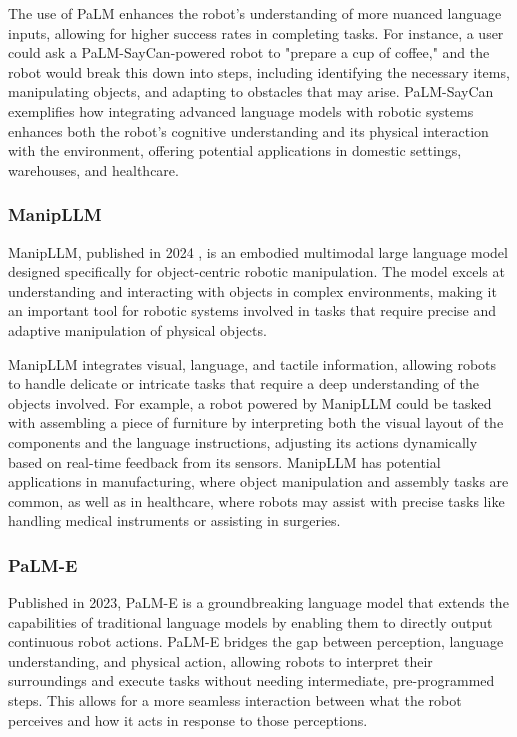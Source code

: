 The use of PaLM enhances the robot's understanding of more nuanced language inputs, allowing for higher success rates in completing tasks. 
For instance, a user could ask a PaLM-SayCan-powered robot to "prepare a cup of coffee," and the robot would break this down into steps, including identifying the necessary items, manipulating objects, and adapting to obstacles that may arise. 
PaLM-SayCan exemplifies how integrating advanced language models with robotic systems enhances both the robot's cognitive understanding and its physical interaction with the environment, offering potential applications in domestic settings, warehouses, and healthcare.

\subsubsection{ManipLLM}

ManipLLM, published in 2024 \cite{li2024manipllm}, is an embodied multimodal large language model designed specifically for object-centric robotic manipulation. 
The model excels at understanding and interacting with objects in complex environments, making it an important tool for robotic systems involved in tasks that require precise and adaptive manipulation of physical objects.

ManipLLM integrates visual, language, and tactile information, allowing robots to handle delicate or intricate tasks that require a deep understanding of the objects involved. 
For example, a robot powered by ManipLLM could be tasked with assembling a piece of furniture by interpreting both the visual layout of the components and the language instructions, adjusting its actions dynamically based on real-time feedback from its sensors. 
ManipLLM has potential applications in manufacturing, where object manipulation and assembly tasks are common, as well as in healthcare, where robots may assist with precise tasks like handling medical instruments or assisting in surgeries.

\subsubsection{PaLM-E}

Published in 2023, PaLM-E \cite{driess2023palm} is a groundbreaking language model that extends the capabilities of traditional language models by enabling them to directly output continuous robot actions. 
PaLM-E bridges the gap between perception, language understanding, and physical action, allowing robots to interpret their surroundings and execute tasks without needing intermediate, pre-programmed steps. 
This allows for a more seamless interaction between what the robot perceives and how it acts in response to those perceptions.

